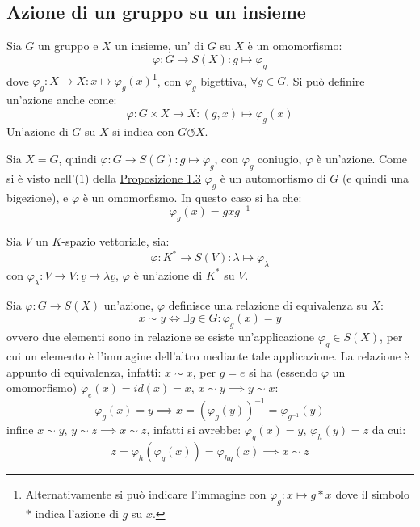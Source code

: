 \documentclass[11pt]{scrartcl}
\begin{document}
\newpage
\subsection{Azione di un gruppo su un insieme}

\begin{definition}
    Sia $G$ un gruppo e $X$ un insieme, un' di $G$ su $X$ è un omomorfismo:
        \[ \varphi : G \longrightarrow S(X) : g \longmapsto \varphi_g 
            \]
    dove $\varphi_g : X \longrightarrow X : x \longmapsto \varphi_g(x)$\footnote{Alternativamente si può indicare l'immagine con $\varphi_g : x \longmapsto g \ast x$ dove il simbolo $\ast$ indica l'azione di $g$ su $x$.},
     con $\varphi_g$ bigettiva, $\forall g \in G$. Si può definire un'azione anche come:
        \[ \varphi : G \times X \longrightarrow X : (g,x) \longmapsto \varphi_g(x)
            \]
    Un'azione di $G$ su $X$ si indica con $G \circlearrowleft X$.
\end{definition}

\begin{example}
    Sia $X = G$, quindi $\varphi : G \longrightarrow S(G) : g \longmapsto \varphi_g$, con $\varphi_g$ coniugio, $\varphi$ è un'azione. Come si è visto nell'($1$)
    della \hyperref[prop1]{Proposizione 1.3} $\varphi_g$ è un automorfismo di $G$ (e quindi una bigezione), e $\varphi$ è un omomorfismo. In questo caso si ha che:
        \[ \varphi_g(x) = gxg^{-1}
            \]
\end{example}

\begin{example}
    Sia $V$ un $K$-spazio vettoriale, sia:
        \[ \varphi : K^* \longrightarrow S(V) : \lambda \longmapsto \varphi_\lambda
            \]
    con $\varphi_\lambda : V \longrightarrow V : \underline v \longmapsto \lambda \underline v$, $\varphi$ è un'azione di $K^*$ su $V$.
\end{example}

Sia $\varphi: G \longrightarrow S(X)$ un'azione, $\varphi$ definisce una relazione di equivalenza su $X$:
    \[ x \sim y \iff \exists g \in G : \varphi_g(x) = y
        \]
    ovvero due elementi sono in relazione se esiste un'applicazione $\varphi_g \in S(X)$, per cui un elemento è l'immagine dell'altro mediante 
    tale applicazione. La relazione è appunto di equivalenza, infatti: $x \sim x$, per $g = e$ si ha (essendo $\varphi$ un omomorfismo) $\varphi_e(x) = id(x) = x$, 
    $x \sim y \implies y \sim x$:
        \[ \varphi_g(x) = y \implies x = (\varphi_g(y))^{-1} = \varphi_{g^{-1}}(y)
            \]
    infine $x \sim y$, $y \sim z \implies x \sim z$, infatti si avrebbe: $\varphi_g(x) = y$, $\varphi_h(y) = z$ da cui:
        \[ z = \varphi_h(\varphi_g(x)) = \varphi_{hg}(x) \implies x \sim z
            \]
\end{document}
